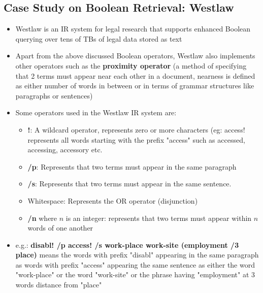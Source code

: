 \documentclass{article}
\begin{document}
\subsection{Case Study on Boolean Retrieval: Westlaw}
\begin{itemize}
    \item Westlaw is an IR system for legal research that supports enhanced Boolean querying over tens of TBs of legal data stored as text
    
    \item Apart from the above discussed Boolean operators, Westlaw also implements other operators such as the \textbf{proximity operator} (a method of specifying that 2 terms must appear near each other in a document, nearness is defined as either number of words in between or in terms of grammar structures like paragraphs or sentences)
    
    \item Some operators used in the Westlaw IR system are:
    \begin{itemize}
        \item \textbf{!}: A wildcard operator, represents zero or more characters (eg: access! represents all words starting with the prefix "access" such as accessed, accessing, accessory etc. 
        
        \item \textbf{/p}: Represents that two terms must appear in the same paragraph 
        
        \item \textbf{/s}: Represents that two terms must appear in the same sentence. 
        
        \item Whitespace: Represents the OR operator (disjunction)
        
        \item \textbf{/n} where $n$ is an integer: represents that two terms must appear within $n$ words of one another
    \end{itemize}
    
    \item e.g.: \textbf{disabl! /p access! /s work-place work-site (employment /3 place)} means the words with prefix "disabl" appearing in the same paragraph as words with prefix "access" appearing the same sentence as either the word "work-place" or the word "work-site" or the phrase having "employment" at 3 words distance from "place"
\end{itemize}
\end{document}
